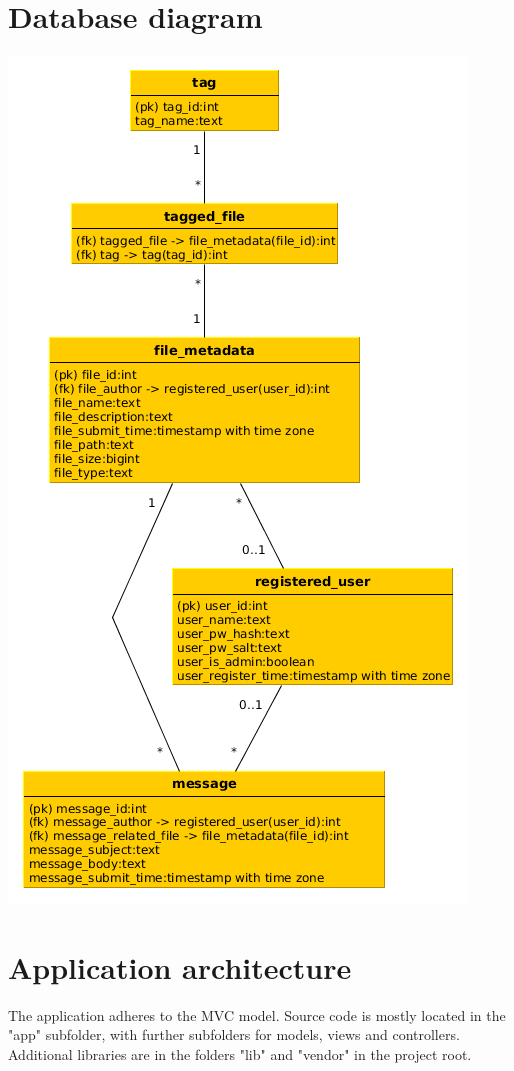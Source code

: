 \documentclass[10pt,a4paper]{article}
\begin{document}
\section{Database diagram}
\includegraphics[scale=0.65]{diagrams/database.png}

\section{Application architecture}
The application adheres to the MVC model. Source code is mostly located in the "app" subfolder, with further subfolders for models, views and controllers. Additional libraries are in the folders "lib" and "vendor" in the project root. 
\end{document}
